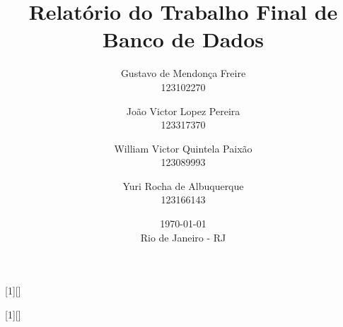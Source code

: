 \usepackage[brazil]{babel}
\usepackage[utf8]{inputenc}
\usepackage[T1]{fontenc}


\usepackage{tocloft}
\usepackage{hyperref}
\usepackage{csquotes}
\usepackage[backend=biber, maxnames=99]{biblatex}
\usepackage{graphicx}
\usepackage{float}

\graphicspath{{figures/}}


\usepackage[margin=0.9in]{geometry}         %
\usepackage{listings}
\usepackage{amsmath, amssymb}             %
\usepackage{indentfirst}                  %
\usepackage{xcolor}                       %
\setlength{\parskip}{\baselineskip}       %
\setlength{\footnotesep}{0.8em}           %
\setlength{\skip\footins}{2em}            %
\setlength{\cftbeforechapskip}{12pt}      %
\setlength{\cftbeforesecskip}{6pt}        %


\title{ Relatório do Trabalho Final de Banco de Dados}
\date{\today\\ \vfill Rio de Janeiro - RJ}
\author{Gustavo de Mendonça Freire     \\ 123102270
   \and João Victor Lopez Pereira      \\ 123317370
   \and William Victor Quintela Paixão \\ 123089993
   \and Yuri Rocha de Albuquerque      \\ 123166143
}


[1][]{
  \lstset{
    basicstyle=\ttfamily,
    columns=flexible,
    breaklines=true,
    breakatwhitespace=true,
    frame=none,
    basewidth=0.5em,
    aboveskip=13pt,
    belowskip=0pt,
    #1
  }
}{}

[1][]{
  \lstset{
    basicstyle=\ttfamily\itshape,
    breaklines=true,
    breakatwhitespace=true,
    frame=none,
    aboveskip=0pt,
    #1
  }
}{}

